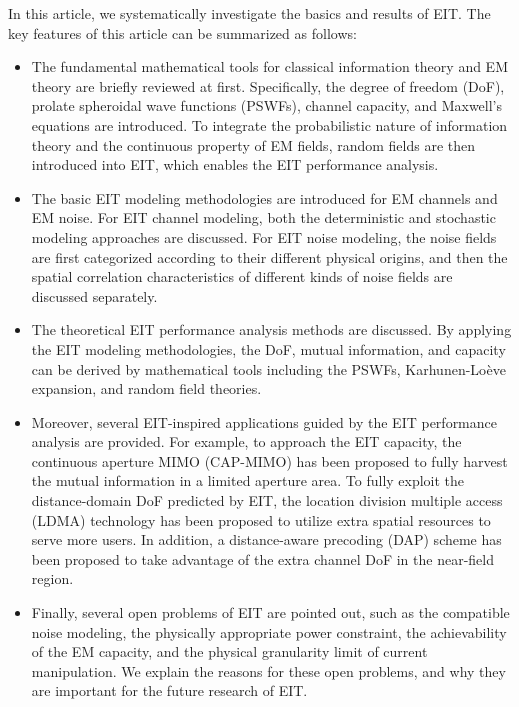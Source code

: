 \documentclass[journal,twocolumn]{IEEEtran}
\begin{document}
In this article, we systematically investigate the basics and results of EIT. The key features of this article can be summarized as follows:
\begin{itemize}
\item{The fundamental mathematical tools for classical information theory and EM theory are briefly reviewed at first. Specifically, the degree of freedom (DoF), prolate spheroidal wave functions (PSWFs), channel capacity, and Maxwell's equations are introduced. To integrate the probabilistic nature of information theory and the continuous property of EM fields, random fields are then introduced into EIT, which enables the EIT performance analysis. }
\item{The basic EIT modeling methodologies are introduced for EM channels and EM noise. For EIT channel modeling, both the deterministic and stochastic modeling approaches are discussed. For EIT noise modeling, the noise fields are first categorized according to their different physical origins, and then the spatial correlation characteristics of different kinds of noise fields are discussed separately. }
\item{The theoretical EIT performance analysis methods are discussed. By applying the EIT modeling methodologies, the DoF, mutual information, and capacity can be derived by mathematical tools including the PSWFs, Karhunen-Lo\`{e}ve expansion, and random field theories. } 
\item Moreover, several EIT-inspired applications guided by the EIT performance analysis are provided. For example, to approach the EIT capacity, the continuous aperture MIMO (CAP-MIMO) has been proposed to fully harvest the mutual information in a limited aperture area. To fully exploit the distance-domain DoF predicted by EIT, the location division multiple access (LDMA) technology has been proposed to utilize extra spatial resources to serve more users. In addition, a distance-aware precoding (DAP) scheme has been proposed to take advantage of the extra channel DoF in the near-field region.  %
\item{Finally, several open problems of EIT are pointed out, such as the compatible noise modeling, the physically appropriate power constraint, the achievability of the EM capacity, and the physical granularity limit of current manipulation. We explain the reasons for these open problems, and why they are important for the future research of EIT. }
\end{itemize}
\end{document}
